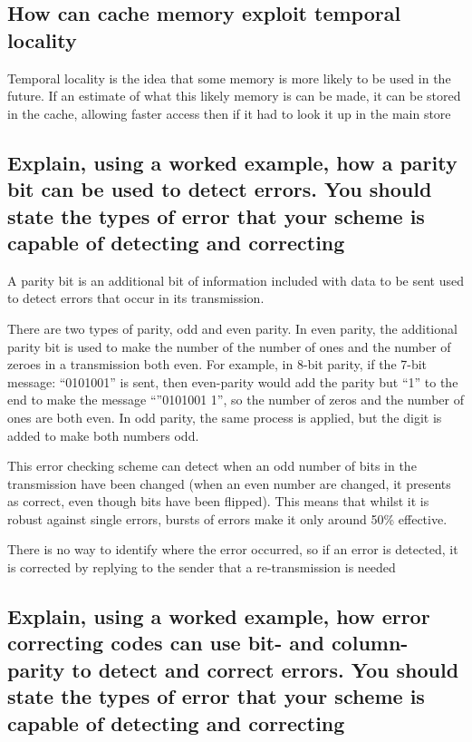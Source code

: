 \documentclass{article}
\begin{document}
\subsection{How can cache memory exploit temporal locality}

Temporal locality is the idea that some memory is more likely to be used
in the future. If an estimate of what this likely memory is can be made,
it can be stored in the cache, allowing faster access then if it had to
look it up in the main store


\subsection{Explain, using a worked example, how a parity bit can be
used to detect errors. You should state the types of error that your
scheme is capable of detecting and correcting}

A parity bit is an additional bit of information included with data to
be sent used to detect errors that occur in its transmission.

There are two types of parity, odd and even parity. In even parity, the
additional parity bit is used to make the number of the number of ones
and the number of zeroes in a transmission both even. For example, in
8-bit parity, if the 7-bit message: ``0101001'' is sent, then
even-parity would add the parity but ``1'' to the end to make the
message ``''0101001 1'', so the number of zeros and the number of ones
are both even. In odd parity, the same process is applied, but the digit
is added to make both numbers odd.

This error checking scheme can detect when an odd number of bits in the
transmission have been changed (when an even number are changed, it
presents as correct, even though bits have been flipped). This means
that whilst it is robust against single errors, bursts of errors make it
only around 50\% effective.

There is no way to identify where the error occurred, so if an error is
detected, it is corrected by replying to the sender that a
re-transmission is needed


\subsection{Explain, using a worked example, how error correcting codes
can use bit- and column-parity to detect and correct errors. You should
state the types of error that your scheme is capable of detecting and
correcting}
\end{document}
